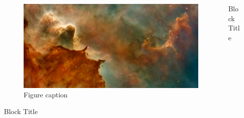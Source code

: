 \documentclass[final, 12pt]{beamer}
\newlength{\onecolwid}
\begin{document}
\begin{frame}[t]
\begin{columns}[t]
\begin{column}{\onecolwid}
\end{column} %

\begin{column}{\onecolwid} %

\begin{exampleblock}{}

\lipsum[2]

\end{exampleblock}

\begin{figure}
\centering
\includegraphics[width=\linewidth]{img/nasa-89127}\hspace*{1.5em}
\caption{Figure caption}
\label{fig:fig3}
\end{figure}

\begin{block}{Block Title}

\lipsum[6-7]

\end{block}

\end{column} %

\begin{column}{\onecolwid} %

\begin{block}{Block Title}

\lipsum[1-2]

\end{block}


\end{column}
\end{columns}
\end{frame}
\end{document}
